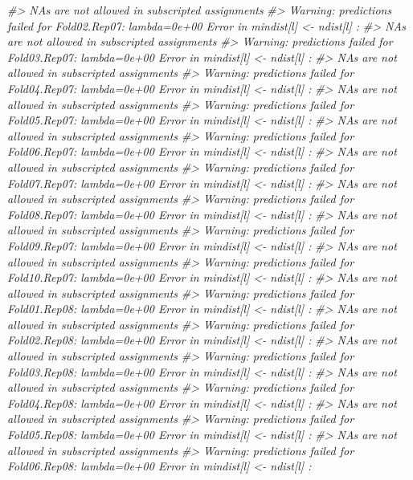 \documentclass[]{book}
\newenvironment{Shaded}{\begin{snugshade}}{\end{snugshade}}
\newcommand{\CommentTok}[1]{\textcolor[rgb]{0.56,0.35,0.01}{\textit{#1}}}
\begin{document}
\begin{Shaded}
\begin{Highlighting}[]
\CommentTok{#>   NAs are not allowed in subscripted assignments}
\CommentTok{#> Warning: predictions failed for Fold02.Rep07: lambda=0e+00 Error in mindist[l] <- ndist[l] : }
\CommentTok{#>   NAs are not allowed in subscripted assignments}
\CommentTok{#> Warning: predictions failed for Fold03.Rep07: lambda=0e+00 Error in mindist[l] <- ndist[l] : }
\CommentTok{#>   NAs are not allowed in subscripted assignments}
\CommentTok{#> Warning: predictions failed for Fold04.Rep07: lambda=0e+00 Error in mindist[l] <- ndist[l] : }
\CommentTok{#>   NAs are not allowed in subscripted assignments}
\CommentTok{#> Warning: predictions failed for Fold05.Rep07: lambda=0e+00 Error in mindist[l] <- ndist[l] : }
\CommentTok{#>   NAs are not allowed in subscripted assignments}
\CommentTok{#> Warning: predictions failed for Fold06.Rep07: lambda=0e+00 Error in mindist[l] <- ndist[l] : }
\CommentTok{#>   NAs are not allowed in subscripted assignments}
\CommentTok{#> Warning: predictions failed for Fold07.Rep07: lambda=0e+00 Error in mindist[l] <- ndist[l] : }
\CommentTok{#>   NAs are not allowed in subscripted assignments}
\CommentTok{#> Warning: predictions failed for Fold08.Rep07: lambda=0e+00 Error in mindist[l] <- ndist[l] : }
\CommentTok{#>   NAs are not allowed in subscripted assignments}
\CommentTok{#> Warning: predictions failed for Fold09.Rep07: lambda=0e+00 Error in mindist[l] <- ndist[l] : }
\CommentTok{#>   NAs are not allowed in subscripted assignments}
\CommentTok{#> Warning: predictions failed for Fold10.Rep07: lambda=0e+00 Error in mindist[l] <- ndist[l] : }
\CommentTok{#>   NAs are not allowed in subscripted assignments}
\CommentTok{#> Warning: predictions failed for Fold01.Rep08: lambda=0e+00 Error in mindist[l] <- ndist[l] : }
\CommentTok{#>   NAs are not allowed in subscripted assignments}
\CommentTok{#> Warning: predictions failed for Fold02.Rep08: lambda=0e+00 Error in mindist[l] <- ndist[l] : }
\CommentTok{#>   NAs are not allowed in subscripted assignments}
\CommentTok{#> Warning: predictions failed for Fold03.Rep08: lambda=0e+00 Error in mindist[l] <- ndist[l] : }
\CommentTok{#>   NAs are not allowed in subscripted assignments}
\CommentTok{#> Warning: predictions failed for Fold04.Rep08: lambda=0e+00 Error in mindist[l] <- ndist[l] : }
\CommentTok{#>   NAs are not allowed in subscripted assignments}
\CommentTok{#> Warning: predictions failed for Fold05.Rep08: lambda=0e+00 Error in mindist[l] <- ndist[l] : }
\CommentTok{#>   NAs are not allowed in subscripted assignments}
\CommentTok{#> Warning: predictions failed for Fold06.Rep08: lambda=0e+00 Error in mindist[l] <- ndist[l] : }

\end{Highlighting}
\end{Shaded}
\end{document}
